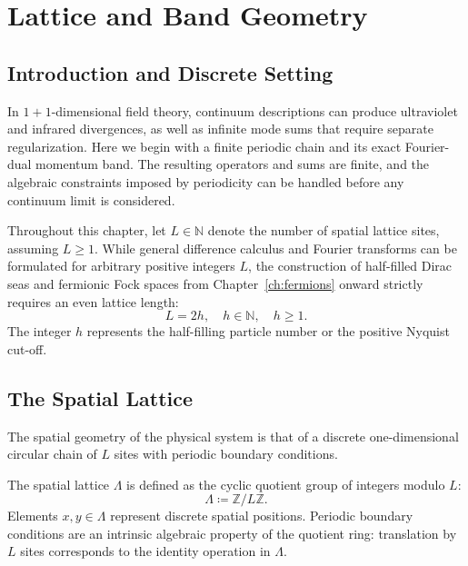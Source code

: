 \chapter{Lattice and Band Geometry}
\label{ch:lattice_band}

\section{Introduction and Discrete Setting}

In $1+1$-dimensional field theory, continuum descriptions can produce ultraviolet and infrared divergences, as well as infinite mode sums that require separate regularization. Here we begin with a finite periodic chain and its exact Fourier-dual momentum band. The resulting operators and sums are finite, and the algebraic constraints imposed by periodicity can be handled before any continuum limit is considered.

Throughout this chapter, let $L \in \mathbb{N}$ denote the number of spatial lattice sites, assuming $L \ge 1$. While general difference calculus and Fourier transforms can be formulated for arbitrary positive integers $L$, the construction of half-filled Dirac seas and fermionic Fock spaces from Chapter~\ref{ch:fermions} onward strictly requires an even lattice length:
\begin{equation}
L = 2h, \quad h \in \mathbb{N}, \quad h \ge 1.
\end{equation}
The integer $h$ represents the half-filling particle number or the positive Nyquist cut-off.

\section{The Spatial Lattice}

The spatial geometry of the physical system is that of a discrete one-dimensional circular chain of $L$ sites with periodic boundary conditions.

\begin{definition}
The spatial lattice $\Lambda$ is defined as the cyclic quotient group of integers modulo $L$:
\begin{equation}
\Lambda \coloneqq \mathbb{Z}/L\mathbb{Z}.
\end{equation}
Elements $x, y \in \Lambda$ represent discrete spatial positions. Periodic boundary conditions are an intrinsic algebraic property of the quotient ring: translation by $L$ sites corresponds to the identity operation in $\Lambda$.
\end{definition}

